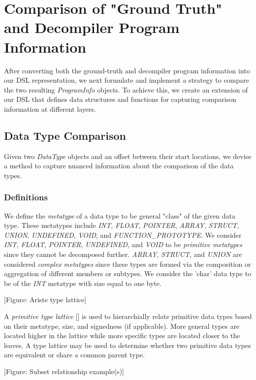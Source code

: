 \section{Comparison of "Ground Truth" and Decompiler Program Information}

After converting both the ground-truth and decompiler program information into our DSL representation, we next formulate and implement a strategy to compare the two resulting \emph{ProgramInfo} objects. To achieve this, we create an extension of our DSL that defines data structures and functions for capturing comparison information at different layers.

\subsection{Data Type Comparison}

Given two \emph{DataType} objects and an offset between their start locations, we devise a method to capture nuanced information about the comparison of the data types.

\subsubsection{Definitions}

We define the \emph{metatype} of a data type to be general "class" of the given data type. These metatypes include \emph{INT}, \emph{FLOAT}, \emph{POINTER}, \emph{ARRAY}, \emph{STRUCT}, \emph{UNION}, \emph{UNDEFINED}, \emph{VOID}, and \emph{FUNCTION\_PROTOTYPE}. We consider \emph{INT}, \emph{FLOAT}, \emph{POINTER}, \emph{UNDEFINED}, and \emph{VOID} to be \emph{primitive metatypes} since they cannot be decomposed further. \emph{ARRAY}, \emph{STRUCT}, and \emph{UNION} are considered \emph{complex metatypes} since these types are formed via the composition or aggregation of different members or subtypes. We consider the 'char' data type to be of the \emph{INT} metatype with size equal to one byte.

[Figure: Ariste type lattice]

A \emph{primitive type lattice} [] is used to hierarchially relate primitive data types based on their metatype, size, and signedness (if applicable). More general types are located higher in the lattice while more specific types are located closer to the leaves. A type lattice may be used to determine whether two primitive data types are equivalent or share a common parent type.

[Figure: Subset relationship example(s)]

